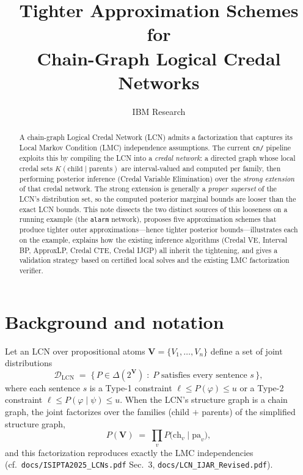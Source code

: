 \documentclass[11pt]{article}
\title{Tighter Approximation Schemes for\\Chain-Graph Logical Credal Networks}
\author{IBM Research}
\date{}
\begin{document}
\maketitle

\begin{abstract}
A chain-graph Logical Credal Network (LCN) admits a factorization that captures its
Local Markov Condition (LMC) independence assumptions. The current \texttt{cn/} pipeline
exploits this by compiling the LCN into a \emph{credal network}: a directed graph whose
local credal sets $K(\mathrm{child}\mid\mathrm{parents})$ are interval-valued and computed
per family, then performing posterior inference (Credal Variable Elimination) over the
\emph{strong extension} of that credal network. The strong extension is generally a
\emph{proper superset} of the LCN's distribution set, so the computed posterior marginal
bounds are looser than the exact LCN bounds. This note dissects the two distinct sources
of this looseness on a running example (the \texttt{alarm} network), proposes five
approximation schemes that produce tighter outer approximations---hence tighter posterior
bounds---illustrates each on the example, explains how the existing inference algorithms
(Credal VE, Interval BP, ApproxLP, Credal CTE, Credal IJGP) all inherit the tightening,
and gives a validation strategy based on certified local solves and the existing LMC
factorization verifier.
\end{abstract}

\section{Background and notation}

Let an LCN over propositional atoms $\mathbf{V}=\{V_1,\dots,V_n\}$ define a set of joint
distributions
\[
  \mathcal{D}_{\mathrm{LCN}} \;=\; \bigl\{\, P \in \Delta(2^{\mathbf{V}}) \;:\; P \text{ satisfies every sentence } s \,\bigr\},
\]
where each sentence $s$ is a Type-1 constraint $\ell \le P(\varphi) \le u$ or a Type-2
constraint $\ell \le P(\varphi\mid\psi) \le u$. When the LCN's structure graph is a chain
graph, the joint factorizes over the families (child $+$ parents) of the simplified
structure graph,
\begin{equation}\label{eq:factor}
  P(\mathbf{V}) \;=\; \prod_{v} P\!\bigl(\mathrm{ch}_v \mid \mathrm{pa}_v\bigr),
\end{equation}
and this factorization reproduces exactly the LMC independencies
(cf.\ \texttt{docs/ISIPTA2025\_LCNs.pdf} Sec.~3, \texttt{docs/LCN\_IJAR\_Revised.pdf}).
\end{document}
